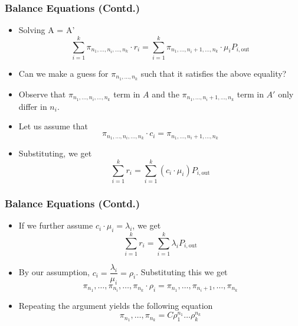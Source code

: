 \documentclass[10pt,notes]{beamer}
\begin{document}
\begin{frame}
    \frametitle{Balance Equations (Contd.)}
    \begin{itemize}
        \item Solving A = A'
            $$\sum_{i=1}^{k} \pi_{n_1,\ldots,n_i,\ldots,n_k} \cdot r_i = \sum_{i=1}^{k} \pi_{n_1,\ldots,n_i+1,\ldots,n_k} \cdot \mu_i P_{i,\text{out}}$$
        \item Can we make a guess for \(\pi_{n_1,\ldots,n_k}\) such that it satisfies the above equality?
        \item Observe that \(\pi_{n_1,\ldots,n_i,\ldots,n_k}\) term in $A$ and the \(\pi_{n_1,\ldots,n_i+1,\ldots,n_k}\) term in $A'$ only differ in $n_i$.
        \item Let us assume that
            $$\pi_{n_1,\ldots,n_i,\ldots,n_k} \cdot c_i = \pi_{n_1,\ldots,n_i+1,\ldots,n_k}$$
        \item Substituting, we get
            $$\sum_{i=1}^{k} r_i = \sum_{i=1}^{k} (c_i \cdot \mu_i) P_{i,\text{out}}$$
    \end{itemize}
\end{frame}

\begin{frame}
    \frametitle{Balance Equations (Contd.)}
    \begin{itemize}
        \item If we further assume $c_i \cdot \mu_i = \lambda_i$, we get $$\sum_{i=1}^{k} r_i = \sum_{i=1}^{k} \lambda_i P_{i,\text{out}}$$
        \item By our assumption, $c_i = \dfrac{\lambda_i}{\mu_i} = \rho_i$. Substituting this we get
            $$\pi_{n_1}, \ldots, \pi_{n_i}, \ldots, \pi_{n_k} \cdot \rho_i = \pi_{n_1}, \ldots, \pi_{n_i+1}, \ldots, \pi_{n_k}$$
        \item Repeating the argument yields the following equation
            $$\pi_{n_1}, \ldots, \pi_{n_k} = C \rho_{1}^{n_1} \ldots \rho_{k}^{n_k}$$
    \end{itemize}
\end{frame}
\end{document}
